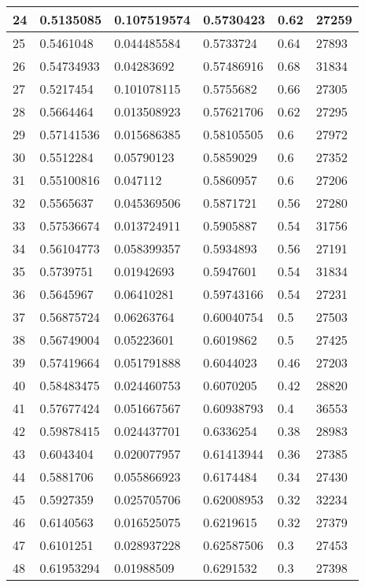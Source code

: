 \begin{longtable}{|l|l|l|l|l|l|}
24 & 0.5135085 & 0.107519574 & 0.5730423 & 0.62 & 27259 \\ \hline 
25 & 0.5461048 & 0.044485584 & 0.5733724 & 0.64 & 27893 \\ \hline 
26 & 0.54734933 & 0.04283692 & 0.57486916 & 0.68 & 31834 \\ \hline 
27 & 0.5217454 & 0.101078115 & 0.5755682 & 0.66 & 27305 \\ \hline 
28 & 0.5664464 & 0.013508923 & 0.57621706 & 0.62 & 27295 \\ \hline 
29 & 0.57141536 & 0.015686385 & 0.58105505 & 0.6 & 27972 \\ \hline 
30 & 0.5512284 & 0.05790123 & 0.5859029 & 0.6 & 27352 \\ \hline 
31 & 0.55100816 & 0.047112 & 0.5860957 & 0.6 & 27206 \\ \hline 
32 & 0.5565637 & 0.045369506 & 0.5871721 & 0.56 & 27280 \\ \hline 
33 & 0.57536674 & 0.013724911 & 0.5905887 & 0.54 & 31756 \\ \hline 
34 & 0.56104773 & 0.058399357 & 0.5934893 & 0.56 & 27191 \\ \hline 
35 & 0.5739751 & 0.01942693 & 0.5947601 & 0.54 & 31834 \\ \hline 
36 & 0.5645967 & 0.06410281 & 0.59743166 & 0.54 & 27231 \\ \hline 
37 & 0.56875724 & 0.06263764 & 0.60040754 & 0.5 & 27503 \\ \hline 
38 & 0.56749004 & 0.05223601 & 0.6019862 & 0.5 & 27425 \\ \hline 
39 & 0.57419664 & 0.051791888 & 0.6044023 & 0.46 & 27203 \\ \hline 
40 & 0.58483475 & 0.024460753 & 0.6070205 & 0.42 & 28820 \\ \hline 
41 & 0.57677424 & 0.051667567 & 0.60938793 & 0.4 & 36553 \\ \hline 
42 & 0.59878415 & 0.024437701 & 0.6336254 & 0.38 & 28983 \\ \hline 
43 & 0.6043404 & 0.020077957 & 0.61413944 & 0.36 & 27385 \\ \hline 
44 & 0.5881706 & 0.055866923 & 0.6174484 & 0.34 & 27430 \\ \hline 
45 & 0.5927359 & 0.025705706 & 0.62008953 & 0.32 & 32234 \\ \hline 
46 & 0.6140563 & 0.016525075 & 0.6219615 & 0.32 & 27379 \\ \hline 
47 & 0.6101251 & 0.028937228 & 0.62587506 & 0.3 & 27453 \\ \hline 
48 & 0.61953294 & 0.01988509 & 0.6291532 & 0.3 & 27398 \\ \hline 

\end{longtable}
